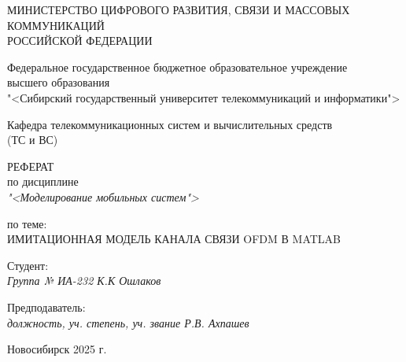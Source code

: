 \thispagestyle{empty}

\begin{center}
    МИНИСТЕРСТВО ЦИФРОВОГО РАЗВИТИЯ, СВЯЗИ И МАССОВЫХ КОММУНИКАЦИЙ \\ РОССИЙСКОЙ ФЕДЕРАЦИИ

    \vspace{20pt}

    Федеральное государственное бюджетное образовательное учреждение  \\  высшего образования \\
    "<Сибирский государственный университет телекоммуникаций и информатики"> \\

    \vspace{20pt}

    Кафедра телекоммуникационных систем и вычислительных средств \\  (ТС и ВС)
\end{center}

\vfill

\begin{center}
    РЕФЕРАТ \\  
    по дисциплине \\
    \textit{"<Моделирование мобильных систем">}

    \vspace{20pt}

    по теме: \\
    \uppercase{ИМИТАЦИОННАЯ МОДЕЛЬ КАНАЛА СВЯЗИ OFDM В MATLAB}
\end{center}

\vfill

    \noindent Студент: \\
    \textit{Группа № ИА-232 \hfill К.К Ошлаков}

    \vspace{20pt}

    \noindent Предподаватель: \\
    \textit{должность, уч. степень, уч. звание \hfill Р.В. Ахпашев}

\vfill

\begin{center}
    Новосибирск 2025 г.
\end{center}